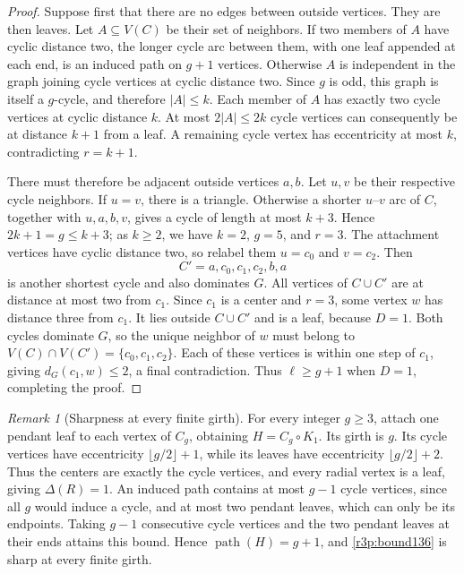 \documentclass[11pt,a4paper]{article}
\theoremstyle{remark}
\newtheorem{remark}[theorem]{Remark}
\begin{document}
\begin{proof}
Suppose first that there are no edges between outside vertices.
They are then leaves. Let $A\subseteq V(C)$ be their set of neighbors.
If two members of $A$ have cyclic distance two, the longer cycle arc
between them, with one leaf appended at each end, is an induced path
on $g+1$ vertices. Otherwise $A$ is independent in the graph joining
cycle vertices at cyclic distance two. Since $g$ is odd, this graph is
itself a $g$-cycle, and therefore $|A|\leq k$.
Each member of $A$ has exactly two cycle vertices at cyclic distance
$k$. At most $2|A|\leq2k$ cycle vertices can consequently be at
distance $k+1$ from a leaf. A remaining cycle vertex has eccentricity
at most $k$, contradicting $r=k+1$.

There must therefore be adjacent outside vertices $a,b$. Let $u,v$
be their respective cycle neighbors. If $u=v$, there is a triangle.
Otherwise a shorter $u$--$v$ arc of $C$, together with $u,a,b,v$,
gives a cycle of length at most $k+3$. Hence $2k+1=g\leq k+3$;
as $k\geq2$, we have $k=2$, $g=5$, and $r=3$.
The attachment vertices have cyclic distance two, so relabel them
$u=c_0$ and $v=c_2$. Then
\[
 C'=a,c_0,c_1,c_2,b,a
\]
is another shortest cycle and also dominates $G$.
All vertices of $C\cup C'$ are at distance at most two from $c_1$.
Since $c_1$ is a center and $r=3$, some vertex $w$ has distance three
from $c_1$. It lies outside $C\cup C'$ and is a leaf, because $D=1$.
Both cycles dominate $G$, so the unique neighbor of $w$ must belong to
$V(C)\cap V(C')=\{c_0,c_1,c_2\}$. Each of these vertices is within one
step of $c_1$, giving $d_G(c_1,w)\leq2$, a final contradiction.
Thus $\ell\geq g+1$ when $D=1$, completing the proof.
\end{proof}

\begin{remark}[Sharpness at every finite girth]
\label{r3p:sharpness}
For every integer $g\geq3$, attach one pendant leaf to each vertex of
$C_g$, obtaining $H=C_g\circ K_1$. Its girth is $g$. Its cycle vertices
have eccentricity $\lfloor g/2\rfloor+1$, while its leaves have
eccentricity $\lfloor g/2\rfloor+2$. Thus the centers are exactly the
cycle vertices, and every radial vertex is a leaf, giving $\Delta(R)=1$.
An induced path contains at most $g-1$ cycle vertices, since all $g$
would induce a cycle, and at most two pendant leaves, which can only
be its endpoints. Taking $g-1$ consecutive cycle vertices and the two
pendant leaves at their ends attains this bound. Hence
$\operatorname{path}(H)=g+1$, and \eqref{r3p:bound136} is sharp at every
finite girth.
\end{remark}
\end{document}
